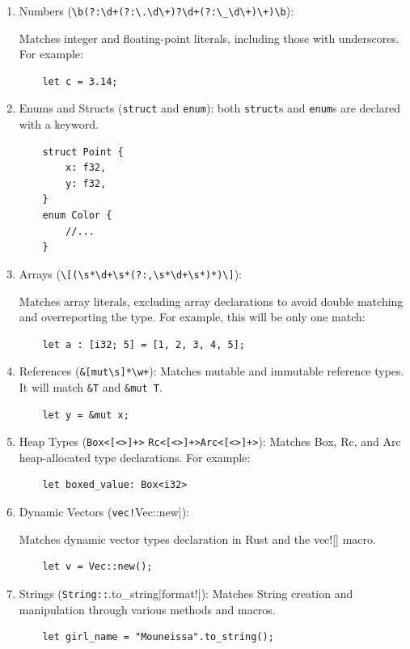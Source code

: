 \documentclass[nomenclature, english, bibtex]{kththesis}
\begin{document}
\begin{enumerate}
    \item Numbers (\verb|\b(?:\d+(?:\.\d\+)?\d+(?:\_\d\+)\+)\b|): 
    
    Matches integer and floating-point literals, including those with underscores. For example:
    \begin{verbatim}
    let c = 3.14;
    \end{verbatim}
    \item Enums and Structs (\verb|struct| and \verb|enum|): both \texttt{struct}s and \texttt{enum}s are declared with a keyword. 
    \begin{verbatim}
    struct Point {
        x: f32,
        y: f32,
    }
    enum Color {
        //...
    }
    \end{verbatim}
    \item Arrays (\verb|\[(\s*\d+\s*(?:,\s*\d+\s*)*)\]|):
    
    Matches array literals, excluding array declarations to avoid double matching and overreporting the type. For example, this will be only one match:
    \begin{verbatim}
    let a : [i32; 5] = [1, 2, 3, 4, 5];  
    \end{verbatim}
    \item References (\verb|&[mut\s]*\w+|): Matches mutable and immutable reference types. It will match \texttt{\&T} and \texttt{\&mut T}.
    \begin{verbatim}
    let y = &mut x;  
    \end{verbatim}
    \item Heap Types (\verb|Box<[<>]+>| \verb|Rc<[<>]+>|\verb|Arc<[<>]+>|): Matches Box, Rc, and Arc heap-allocated type declarations. For example:
    \begin{verbatim}
    let boxed_value: Box<i32>
    \end{verbatim}
    \item Dynamic Vectors (\verb|vec!|Vec::new|): 
    
    Matches dynamic vector types declaration in Rust and the vec![] macro.
    \begin{verbatim}
    let v = Vec::new();
    \end{verbatim}
    \item Strings (\verb|String::|.to\_string|format!|): 
    Matches String creation and manipulation through various methods and macros.
    \begin{verbatim}
    let girl_name = "Mouneissa".to_string();
    \end{verbatim}
\end{enumerate}
 
\end{document}
